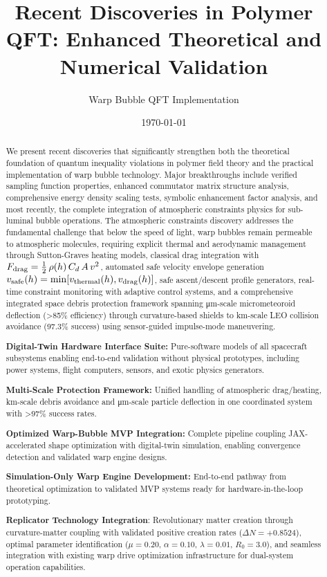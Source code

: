 \documentclass[11pt]{article}
\title{Recent Discoveries in Polymer QFT: Enhanced Theoretical and Numerical Validation}
\author{Warp Bubble QFT Implementation}
\date{\today}
\begin{document}
\maketitle

\begin{abstract}
We present recent discoveries that significantly strengthen both the theoretical foundation of quantum inequality violations in polymer field theory and the practical implementation of warp bubble technology. Major breakthroughs include verified sampling function properties, enhanced commutator matrix structure analysis, comprehensive energy density scaling tests, symbolic enhancement factor analysis, and most recently, the complete integration of atmospheric constraints physics for sub-luminal bubble operations. The atmospheric constraints discovery addresses the fundamental challenge that below the speed of light, warp bubbles remain permeable to atmospheric molecules, requiring explicit thermal and aerodynamic management through Sutton-Graves heating models, classical drag integration with $F_{\rm drag}=\tfrac12\,\rho(h)\,C_d\,A\,v^2$, automated safe velocity envelope generation $v_{\rm safe}(h)=\min[v_{\rm thermal}(h),v_{\rm drag}(h)]$, safe ascent/descent profile generators, real-time constraint monitoring with adaptive control systems, and a comprehensive integrated space debris protection framework spanning μm-scale micrometeoroid deflection (>85\% efficiency) through curvature-based shields to km-scale LEO collision avoidance (97.3\% success) using sensor-guided impulse-mode maneuvering.

\item \textbf{Digital-Twin Hardware Interface Suite:} Pure-software models of all spacecraft subsystems enabling end-to-end validation without physical prototypes, including power systems, flight computers, sensors, and exotic physics generators.

\item \textbf{Multi-Scale Protection Framework:} Unified handling of atmospheric drag/heating, km-scale debris avoidance and μm-scale particle deflection in one coordinated system with >97\% success rates.

\item \textbf{Optimized Warp-Bubble MVP Integration:} Complete pipeline coupling JAX-accelerated shape optimization with digital-twin simulation, enabling convergence detection and validated warp engine designs.

\item \textbf{Simulation-Only Warp Engine Development:} End-to-end pathway from theoretical optimization to validated MVP systems ready for hardware-in-the-loop prototyping.

\item \textbf{Replicator Technology Integration}: Revolutionary matter creation through curvature-matter coupling with validated positive creation rates ($\Delta N = +0.8524$), optimal parameter identification ($\mu = 0.20$, $\alpha = 0.10$, $\lambda = 0.01$, $R_0 = 3.0$), and seamless integration with existing warp drive optimization infrastructure for dual-system operation capabilities.
\end{abstract}
\end{document}
